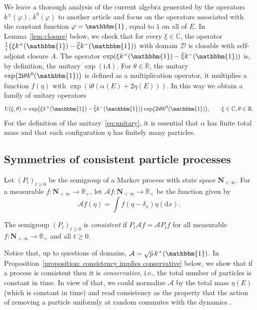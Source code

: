 \documentclass[11pt]{article}
\numberwithin{equation}{section}
\numberwithin{equation}{section}
\newcommand{\R}{\mathbb{R}}
\newcommand{\C}{\mathbb{C}}
\newcommand{\dd}{\mathrm{d}} %
\newcommand{\1}{\mathbbm{1}}
\begin{document}
We leave a thorough analysis of the current algebra generated by the operators $k^\pm(\varphi)$, $k^0(\varphi)$ to another article \cite{algebraic_Floreani} and focus on the operators associated with the constant function $\varphi = \1$, equal to $1$ on all of $E$. In Lemma~\ref{lem:closure} below, we check that for every $\xi \in \C$, the operator $\frac{1}{\mathrm i} \bigl( \xi k^+(\1) - \overline{\xi} k^-(\1))$ with domain $\mathcal D$ is closable with self-adjoint closure $A$. The operator $\exp( \xi k^+(\1) - \overline{\xi} k^-(\1))$ is, by definition, the unitary $\exp(\mathrm i A)$.
For $\theta \in \R$, the unitary $\exp\bigl( 2\mathrm i \theta k^0(\1)\bigr)$ is defined as a multiplication operator, it multiplies a function $f(\eta)$ with $\exp(\mathrm i \theta (\alpha (E) + 2 \eta(E)))$.
In this way we obtain a family of unitary operators
\begin{equation}\label{eq:unitary}
	{\rm U}(\xi,\theta) = \exp\bigl( \xi k^+(\1) - \overline{\xi} k^-(\1)\bigr) \exp\bigl(2\mathrm i\theta k^0(\1)\bigr),\qquad \xi \in \C,\theta\in \R.
\end{equation}
For the definition of the unitary~\eqref{eq:unitary}, it is essential that $\alpha$ has finite total mass and that each configuration $\eta$ has finitely many particles.

\subsection{Symmetries of consistent particle processes}

Let $(P_t)_{t\geq 0}$ be the semigroup of a Markov process with state space $\mathbf N_{<\infty}$. For a measurable $f\colon \mathbf N_{<\infty} \to \R_+$, let $\mathcal A f\colon \mathbf N_{<\infty} \to \R_+$ be the function given by
\[
	\mathcal A f(\eta) = \int f(\eta-\delta_x)\eta(\dd x).
\]

\begin{Definition}
 The semigroup $(P_t)_{t\geq 0}$ is \emph{consistent} if $P_t \mathcal A f = \mathcal A P_t f$ for all measurable $f\colon \mathbf N_{<\infty}\to \R_+$ and all $t\geq 0$.
\end{Definition}

Notice that, up to questions of domains, $\mathcal A = \sqrt p\, k^+(\1)$. In Proposition~\ref{proposition: consistency implies conservative} below, we show that if a process is consistent then it is \emph{conservative}, i.e., the total number of particles is constant in time. In view of that, we could normalize $\mathcal A$ by the total mass $\eta(E)$ (which is constant in time) and read consistency as the property that the action of removing a particle uniformly at random commutes with the dynamics \cite{carinci2021consistent,IntertwiningConsistent}.
\end{document}
